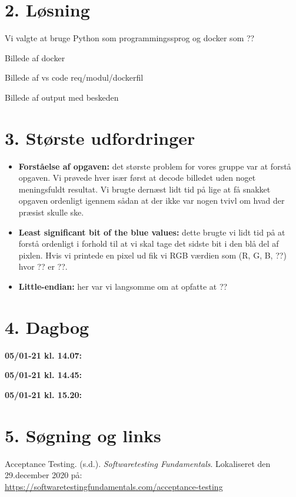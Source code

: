 \documentclass[10pt]{report}
\begin{document}
\chapter*{2. Løsning}
\pagestyle{fancy}
\noindent Vi valgte at bruge Python som programmingssprog og docker som ??

Billede af docker

Billede af vs code req/modul/dockerfil

Billede af output med beskeden


\chapter*{3. Største udfordringer}
\pagestyle{fancy}
\begin{itemize}
  \item \textbf{Forståelse af opgaven:} det største problem for vores gruppe var at forstå opgaven. Vi prøvede hver især først at decode billedet uden noget meningsfuldt resultat. Vi brugte dernæst lidt tid på lige at få snakket opgaven ordenligt igennem sådan at der ikke var nogen tvivl om hvad der præsist skulle ske.
  \item \textbf{Least significant bit of the blue values:} dette brugte vi lidt tid på at forstå ordenligt i forhold til at vi skal tage det sidste bit i den blå del af pixlen. Hvis vi printede en pixel ud fik vi RGB værdien som (R, G, B, ??) hvor ?? er ??.
  \item \textbf{Little-endian:} her var vi langsomme om at opfatte at ??
\end{itemize}

\chapter*{4. Dagbog}
\pagestyle{fancy}

\noindent\textbf{05/01-21 kl. 14.07:}

\noindent\textbf{05/01-21 kl. 14.45:}

\noindent\textbf{05/01-21 kl. 15.20:}


\chapter*{5. Søgning og links}
\pagestyle{fancy}
\noindent Acceptance Testing. (s.d.). \textit{Softwaretesting Fundamentals}. Lokaliseret den 29.december 2020 på:\\
\href{https://softwaretestingfundamentals.com/acceptance-testing}{https://softwaretestingfundamentals.com/acceptance-testing}
\end{document}
